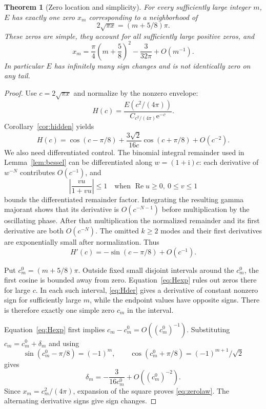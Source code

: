\documentclass[11pt,a4paper]{article}
\newtheorem{theorem}{Theorem}[section]
\theoremstyle{definition}
\theoremstyle{remark}
\newcommand{\e}{\mathrm e}
\newcommand{\ii}{\mathrm i}
\newcommand{\Rea}{\operatorname{Re}}
\numberwithin{equation}{section}
\begin{document}
\begin{theorem}[Zero location and simplicity]\label{thm:zeros}
For every sufficiently large integer $m$, $E$ has exactly one zero $x_m$ corresponding to a neighborhood of
\[
 2\sqrt{\pi x}=(m+5/8)\pi.
\]
These zeros are simple, they account for all sufficiently large positive zeros, and
\begin{equation}\label{eq:zerolaw}
 x_m=\frac\pi4\left(m+\frac58\right)^2
       -\frac3{32\pi}+O(m^{-1}).
\end{equation}
In particular $E$ has infinitely many sign changes and is not identically zero on any tail.
\end{theorem}
\begin{proof}
Use $c=2\sqrt{\pi x}$ and normalize by the nonzero envelope:
\[
 H(c)=\frac{E(c^2/(4\pi))}{C_{c^2/(4\pi)}\e^{-c}}.
\]
Corollary~\ref{cor:hidden} yields
\begin{equation}\label{eq:Hexp}
 H(c)=\cos(c-\pi/8)
       +\frac{3\sqrt2}{16c}\cos(c+\pi/8)+O(c^{-2}).
\end{equation}
We also need differentiated control. The binomial integral remainder used in Lemma~\ref{lem:bessel} can be differentiated along $w=(1+\ii)c$: each derivative of $w^{-N}$ contributes $O(c^{-1})$, and
\[
 \left|\frac{v u}{1+v u}\right|\le1
 \quad\text{when }\Rea u\ge0,\ 0\le v\le1
\]
bounds the differentiated remainder factor. Integrating the resulting gamma majorant shows that its derivative is $O(c^{-N-1})$ before multiplication by the oscillating phase. After that multiplication the normalized remainder and its first derivative are both $O(c^{-N})$. The omitted $k\ge2$ modes and their first derivatives are exponentially small after normalization. Thus
\begin{equation}\label{eq:Hder}
 H'(c)=-\sin(c-\pi/8)+O(c^{-1}).
\end{equation}

Put $c_m^0=(m+5/8)\pi$. Outside fixed small disjoint intervals around the $c_m^0$, the first cosine is bounded away from zero. Equation~\eqref{eq:Hexp} rules out zeros there for large $c$. In each such interval, \eqref{eq:Hder} gives a derivative of constant nonzero sign for sufficiently large $m$, while the endpoint values have opposite signs. There is therefore exactly one simple zero $c_m$ in the interval.

Equation~\eqref{eq:Hexp} first implies $c_m-c_m^0=O((c_m^0)^{-1})$. Substituting $c_m=c_m^0+\delta_m$ and using
\[
 \sin(c_m^0-\pi/8)=(-1)^m,
 \qquad \cos(c_m^0+\pi/8)=(-1)^{m+1}/\sqrt2
\]
gives
\[
 \delta_m=-\frac3{16c_m^0}+O((c_m^0)^{-2}).
\]
Since $x_m=c_m^2/(4\pi)$, expansion of the square proves \eqref{eq:zerolaw}. The alternating derivative signs give sign changes.
\end{proof}
\end{document}
